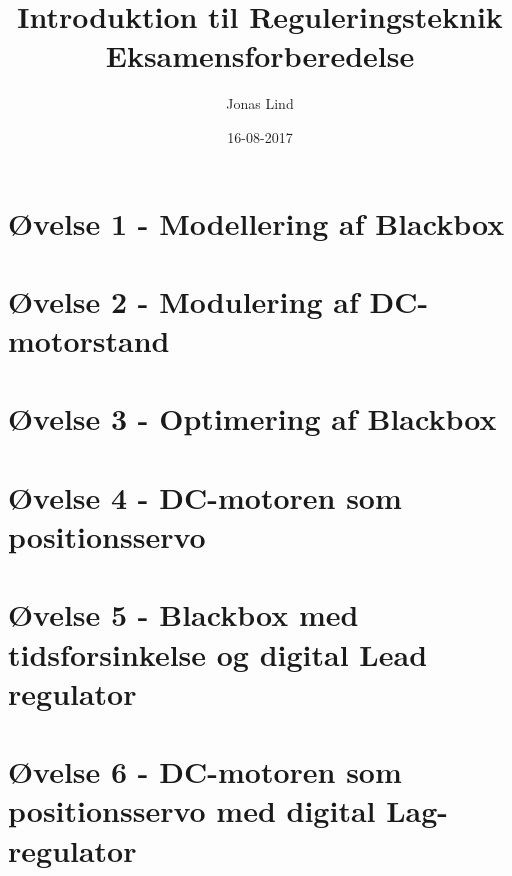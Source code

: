 \documentclass[danish]{article}
\begin{document}
\title{\textbf{Introduktion til Reguleringsteknik}   Eksamensforberedelse}
\author{Jonas Lind}
\date{16-08-2017}
\maketitle

\section{Øvelse 1 - Modellering af Blackbox}

\section{Øvelse 2 -	Modulering af DC-motorstand}

\section{Øvelse 3 - Optimering af Blackbox}

\section{Øvelse 4 - DC-motoren som positionsservo}

\section{Øvelse 5 - Blackbox med tidsforsinkelse og digital Lead regulator}

\section{Øvelse 6 - DC-motoren som positionsservo med digital Lag- regulator}
\end{document}
